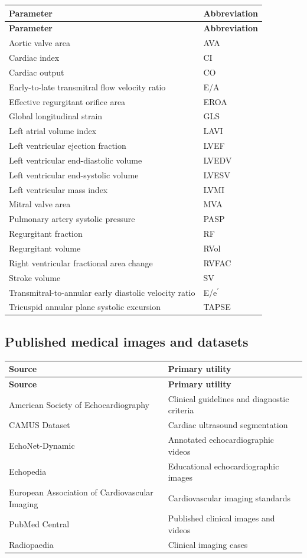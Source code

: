 \begin{longtable}{@{}p{}p{}@{}}
\toprule
\textbf{Parameter} & \textbf{Abbreviation} \\
\midrule
\endfirsthead
\toprule
\textbf{Parameter} & \textbf{Abbreviation} \\
\midrule
\endhead
Aortic valve area & AVA \\
Cardiac index & CI \\
Cardiac output & CO \\
Early-to-late transmitral flow velocity ratio & E/A \\
Effective regurgitant orifice area & EROA \\
Global longitudinal strain & GLS \\
Left atrial volume index & LAVI \\
Left ventricular ejection fraction & LVEF \\
Left ventricular end-diastolic volume & LVEDV \\
Left ventricular end-systolic volume & LVESV \\
Left ventricular mass index & LVMI \\
Mitral valve area & MVA \\
Pulmonary artery systolic pressure & PASP \\
Regurgitant fraction & RF \\
Regurgitant volume & RVol \\
Right ventricular fractional area change & RVFAC \\
Stroke volume & SV \\
Transmitral-to-annular early diastolic velocity ratio & E/e$^{\prime}$ \\
Tricuspid annular plane systolic excursion & TAPSE \\
\bottomrule
\end{longtable}

\subsection{Published medical images and datasets}
\begin{longtable}{@{}p{}p{}@{}}
\toprule
\textbf{Source} & \textbf{Primary utility} \\
\midrule
\endfirsthead
\toprule
\textbf{Source} & \textbf{Primary utility} \\
\midrule
\endhead
American Society of Echocardiography & Clinical guidelines and diagnostic criteria \\
CAMUS Dataset & Cardiac ultrasound segmentation \\
EchoNet-Dynamic & Annotated echocardiographic videos \\
Echopedia & Educational echocardiographic images \\
European Association of Cardiovascular Imaging & Cardiovascular imaging standards \\
PubMed Central & Published clinical images and videos \\
Radiopaedia & Clinical imaging cases \\
\bottomrule
\end{longtable}

